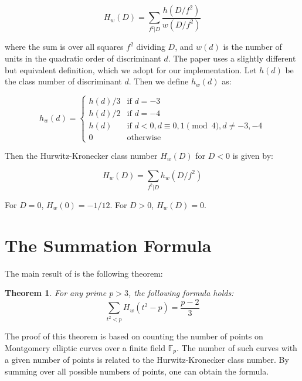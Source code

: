 \documentclass{article}
\begin{document}
\begin{equation}
H_w(D) = \sum_{f^2 | D} \frac{h(D/f^2)}{w(D/f^2)}
\end{equation}

where the sum is over all squares $f^2$ dividing $D$, and $w(d)$ is the number of units in the quadratic order of discriminant $d$. The paper \cite{tsai2025montgomery} uses a slightly different but equivalent definition, which we adopt for our implementation. Let $h(d)$ be the class number of discriminant $d$. Then we define $h_w(d)$ as:

\begin{equation}
h_w(d) =
\begin{cases}
h(d)/3 & \text{if } d = -3 \\
h(d)/2 & \text{if } d = -4 \\
h(d) & \text{if } d < 0, d \equiv 0, 1 \pmod{4}, d \neq -3, -4 \\
0 & \text{otherwise}
\end{cases}
\end{equation}

Then the Hurwitz-Kronecker class number $H_w(D)$ for $D < 0$ is given by:

\begin{equation}
H_w(D) = \sum_{f^2 | D} h_w(D/f^2)
\end{equation}

For $D=0$, $H_w(0) = -1/12$. For $D>0$, $H_w(D)=0$.

\section{The Summation Formula}

The main result of \cite{tsai2025montgomery} is the following theorem:

\newtheorem{theorem}{Theorem}
\begin{theorem}
For any prime $p > 3$, the following formula holds:
\begin{equation}
\sum_{t^2 < p} H_w(t^2 - p) = \frac{p - 2}{3}
\end{equation}
\end{theorem}

The proof of this theorem is based on counting the number of points on Montgomery elliptic curves over a finite field $\mathbb{F}_p$. The number of such curves with a given number of points is related to the Hurwitz-Kronecker class number. By summing over all possible numbers of points, one can obtain the formula.
\end{document}
